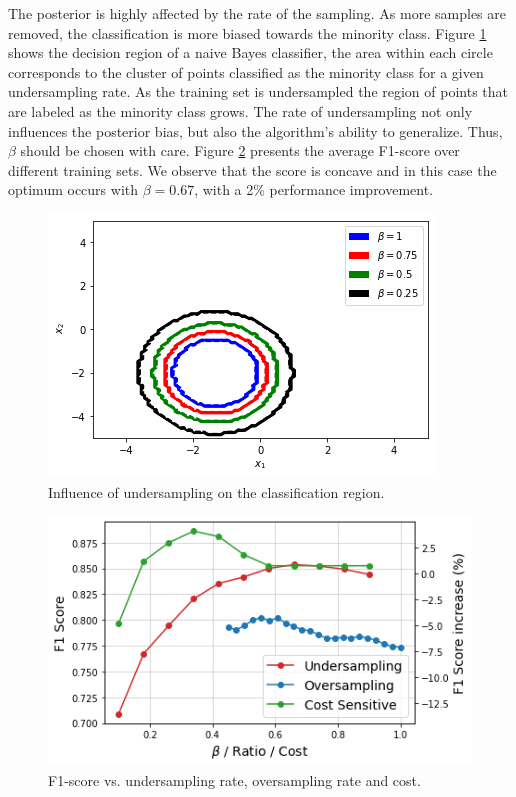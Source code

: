 \documentclass[conference]{IEEEtran}
\begin{document}
		The posterior is highly affected by the rate of the sampling. As more samples are removed, the classification is more biased towards the minority class. Figure \ref{fig:Undersampling_2D_Contour_Classification} shows the decision region of a naive Bayes classifier, the area within each circle corresponds to the cluster of points classified as the minority class for a given undersampling rate. As the training set is undersampled the region of points that are labeled as the minority class grows. The rate of undersampling not only influences the posterior bias, but also the algorithm's ability to generalize. Thus, $\beta$ should be chosen with care. Figure \ref{fig:F1_Score} presents the average F1-score over different training sets. We observe that the score is concave and in this case the optimum occurs with $\beta=0.67$, with a 2\% performance improvement.

			\begin{figure}[h]
				\includegraphics[scale=0.45]{Undersampling_2D_Contour_Classification}
				\centering
				\caption{Influence of undersampling on the classification region.}
				\label{fig:Undersampling_2D_Contour_Classification}
			\end{figure}
		
		\begin{figure}[h]
			\includegraphics[scale=0.45]{F1_scores_dataset1}
			\centering
			\caption{F1-score vs. undersampling rate, oversampling rate and cost.}
			\label{fig:F1_Score}
		\end{figure}
		
\end{document}

